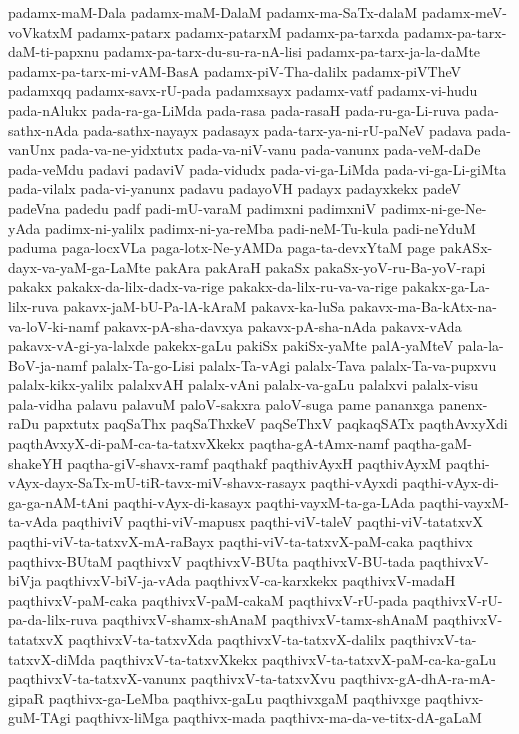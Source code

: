 {padamx-maM-Dala
padamx-maM-DalaM
padamx-ma-SaTx-dalaM
padamx-meV-voVkatxM
padamx-patarx
padamx-patarxM
padamx-pa-tarxda
padamx-pa-tarx-daM-ti-papxnu
padamx-pa-tarx-du-su-ra-nA-lisi
padamx-pa-tarx-ja-la-daMte
padamx-pa-tarx-mi-vAM-BasA
padamx-piV-Tha-dalilx
padamx-piVTheV
padamxqq
padamx-savx-rU-pada
padamxsayx
padamx-vatf
padamx-vi-hudu
pada-nAlukx
pada-ra-ga-LiMda
pada-rasa
pada-rasaH
pada-ru-ga-Li-ruva
pada-sathx-nAda
pada-sathx-nayayx
padasayx
pada-tarx-ya-ni-rU-paNeV
padava
pada-vanUnx
pada-va-ne-yidxtutx
pada-va-niV-vanu
pada-vanunx
pada-veM-daDe
pada-veMdu
padavi
padaviV
pada-vidudx
pada-vi-ga-LiMda
pada-vi-ga-Li-giMta
pada-vilalx
pada-vi-yanunx
padavu
padayoVH
padayx
padayxkekx
padeV
padeVna
padedu
padf
padi-mU-varaM
padimxni
padimxniV
padimx-ni-ge-Ne-yAda
padimx-ni-yalilx
padimx-ni-ya-reMba
padi-neM-Tu-kula
padi-neYduM
paduma
paga-locxVLa
paga-lotx-Ne-yAMDa
paga-ta-devxYtaM
page
pakASx-dayx-va-yaM-ga-LaMte
pakAra
pakAraH
pakaSx
pakaSx-yoV-ru-Ba-yoV-rapi
pakakx
pakakx-da-lilx-dadx-va-rige
pakakx-da-lilx-ru-va-va-rige
pakakx-ga-La-lilx-ruva
pakavx-jaM-bU-Pa-lA-kAraM
pakavx-ka-luSa
pakavx-ma-Ba-kAtx-na-va-loV-ki-namf
pakavx-pA-sha-davxya
pakavx-pA-sha-nAda
pakavx-vAda
pakavx-vA-gi-ya-lalxde
pakekx-gaLu
pakiSx
pakiSx-yaMte
palA-yaMteV
pala-la-BoV-ja-namf
palalx-Ta-go-Lisi
palalx-Ta-vAgi
palalx-Tava
palalx-Ta-va-pupxvu
palalx-kikx-yalilx
palalxvAH
palalx-vAni
palalx-va-gaLu
palalxvi
palalx-visu
pala-vidha
palavu
palavuM
paloV-sakxra
paloV-suga
pame
pananxga
panenx-raDu
papxtutx
paqSaThx
paqSaThxkeV
paqSeThxV
paqkaqSATx
paqthAvxyXdi
paqthAvxyX-di-paM-ca-ta-tatxvXkekx
paqtha-gA-tAmx-namf
paqtha-gaM-shakeYH
paqtha-giV-shavx-ramf
paqthakf
paqthivAyxH
paqthivAyxM
paqthi-vAyx-dayx-SaTx-mU-tiR-tavx-miV-shavx-rasayx
paqthi-vAyxdi
paqthi-vAyx-di-ga-ga-nAM-tAni
paqthi-vAyx-di-kasayx
paqthi-vayxM-ta-ga-LAda
paqthi-vayxM-ta-vAda
paqthiviV
paqthi-viV-mapusx
paqthi-viV-taleV
paqthi-viV-tatatxvX
paqthi-viV-ta-tatxvX-mA-raBayx
paqthi-viV-ta-tatxvX-paM-caka
paqthivx
paqthivx-BUtaM
paqthivxV
paqthivxV-BUta
paqthivxV-BU-tada
paqthivxV-biVja
paqthivxV-biV-ja-vAda
paqthivxV-ca-karxkekx
paqthivxV-madaH
paqthivxV-paM-caka
paqthivxV-paM-cakaM
paqthivxV-rU-pada
paqthivxV-rU-pa-da-lilx-ruva
paqthivxV-shamx-shAnaM
paqthivxV-tamx-shAnaM
paqthivxV-tatatxvX
paqthivxV-ta-tatxvXda
paqthivxV-ta-tatxvX-dalilx
paqthivxV-ta-tatxvX-diMda
paqthivxV-ta-tatxvXkekx
paqthivxV-ta-tatxvX-paM-ca-ka-gaLu
paqthivxV-ta-tatxvX-vanunx
paqthivxV-ta-tatxvXvu
paqthivx-gA-dhA-ra-mA-gipaR
paqthivx-ga-LeMba
paqthivx-gaLu
paqthivxgaM
paqthivxge
paqthivx-guM-TAgi
paqthivx-liMga
paqthivx-mada
paqthivx-ma-da-ve-titx-dA-gaLaM
}
